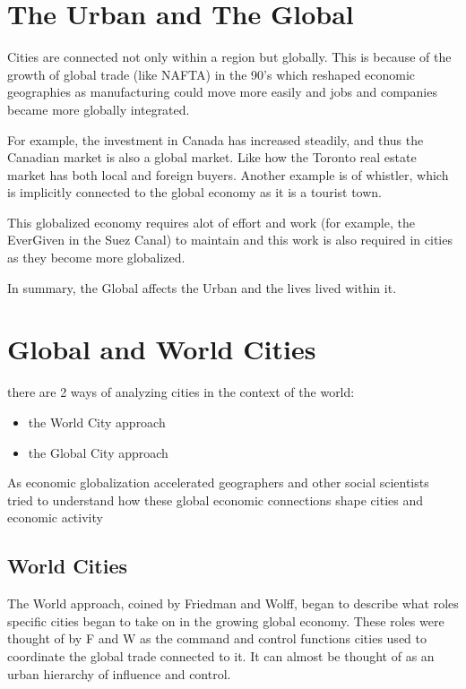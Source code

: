 \documentclass[12pt]{book}
\title{\coursetitle\linebreak\lecturename}
\author{\\Cain Susko\\ 
           \\ \\ \\
      Queen's University 
    \\School of Computing\\}
\begin{document}
\begin{titlepage}
        \maketitle
\end{titlepage}


\section*{The Urban and The Global}
Cities are connected not only within a region but globally.
This is because of the growth of global trade (like NAFTA) in the 90's which reshaped economic geographies as manufacturing could move
        more easily and jobs and companies became more globally integrated.

For example, the investment in Canada has increased steadily, and thus the Canadian market is also a global market. 
Like how the Toronto real estate market has both local and foreign buyers.
Another example is of whistler, which is implicitly connected to the global economy as it is a tourist town.

This globalized economy requires alot of effort and work (for example, the EverGiven in the Suez Canal) to maintain and this work is also required in cities as they become more globalized.

In summary, the Global affects the Urban and the lives lived within it.

\section*{Global and World Cities}
there are 2 ways of analyzing cities in the context of the world:
\begin{itemize}
        \item the World City approach
        \item the Global City approach
\end{itemize}

As economic globalization accelerated geographers and other social scientists tried
to understand how these global economic connections shape cities and economic
activity
\pagebreak

\subsection*{World Cities}
The World approach, coined by Friedman and Wolff, began to describe what roles specific cities began to take on in the 
        growing global economy.
These roles were thought of by F and W as the command and control functions cities used to coordinate the global
        trade connected to it.
It can almost be thought of as an urban hierarchy of influence and control.
\end{document}

